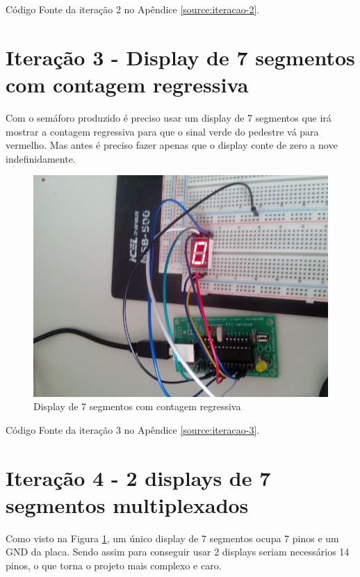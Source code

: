 Código Fonte da iteração 2 no Apêndice \ref{source:iteracao-2}.

\section{Iteração 3 - Display de 7 segmentos com contagem
regressiva}\label{iterauxe7uxe3o-3---display-de-7-segmentos-com-contagem-regressiva}

Com o semáforo produzido é preciso usar um display de 7 segmentos que
irá mostrar a contagem regressiva para que o sinal verde do pedestre vá
para vermelho. Mas antes é preciso fazer apenas que o display conte de
zero a nove indefinidamente.

\begin{figure}[H]
    \includegraphics[scale=0.5]{img/display-7seg-1.jpg}
    \caption{Display de 7 segmentos com contagem regressiva} \label{fig:display-7seg-1}
\end{figure}

Código Fonte da iteração 3 no Apêndice \ref{source:iteracao-3}.

\section{Iteração 4 - 2 displays de 7 segmentos
multiplexados}\label{iterauxe7uxe3o-4---2-displays-de-7-segmentos-multiplexados}

Como visto na Figura \ref{fig:display-7seg-1}, um único display de 7
segmentos ocupa 7 pinos e um GND da placa. Sendo assim para conseguir
usar 2 displays seriam necessários 14 pinos, o que torna o projeto mais
complexo e caro.


